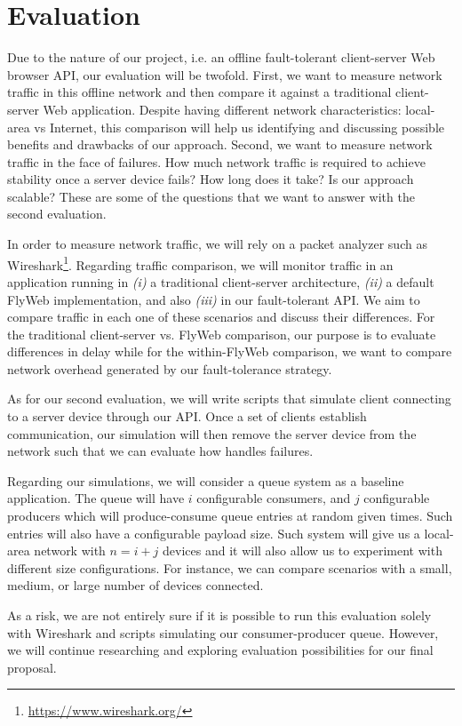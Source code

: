 \section{Evaluation}
\label{sec:evaluation}

Due to the nature of our project, i.e. an offline fault-tolerant client-server Web browser API, our evaluation will be twofold. First, we want to measure network traffic in this offline network and then compare it against a traditional client-server Web application. Despite having different network characteristics: local-area vs Internet, this comparison will help us identifying and discussing possible benefits and drawbacks of our approach. Second, we want to measure network traffic in the face of failures. How much network traffic is required to achieve stability once a server device fails? How long does it take? Is our approach scalable? These are some of the questions that we want to answer with the second evaluation.

In order to measure network traffic, we will rely on a packet analyzer such as Wireshark\footnote{\url{https://www.wireshark.org/}}. Regarding traffic comparison, we will monitor traffic in an application running in {\it (i)} a traditional client-server architecture, {\it (ii)} a default FlyWeb implementation, and also {\it (iii)} in our fault-tolerant API. We aim to compare traffic in each one of these scenarios and discuss their differences. For the traditional client-server vs. FlyWeb comparison, our purpose is to evaluate differences in delay while for the within-FlyWeb comparison, we want to compare network overhead generated by our fault-tolerance strategy. 

As for our second evaluation, we will write scripts that simulate client connecting to a server device through our \texttt{\APIName} API. Once a set of clients establish communication, our simulation will then remove the server device from the network such that we can evaluate how \texttt{\APIName} handles failures. 

Regarding our simulations, we will consider a queue system as a baseline application. The queue will have $i$ configurable consumers, and $j$ configurable producers which will produce-consume queue entries at random given times. Such entries will also have a configurable payload size. Such system will give us a local-area network with $n = i + j$ devices and it will also allow us to experiment with different size configurations. For instance, we can compare scenarios with a small, medium, or large number of devices connected.

As a risk, we are not entirely sure if it is possible to run this evaluation solely with Wireshark and scripts simulating our consumer-producer queue. However, we will continue researching and exploring evaluation possibilities for our final proposal.